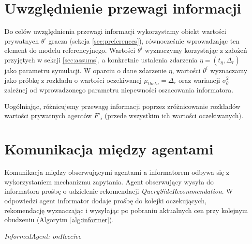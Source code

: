 \section{Uwzględnienie przewagi informacji}
Do celów uwzględnienia przewagi informacji wykorzystamy obiekt wartości prywatnych $\theta^i$ gracza (sekcja \ref{sec:preferences}), równocześnie wprowadzając ten element do modelu referencyjnego. Wartości $\theta^i$ wyznaczymy korzystając z założeń przyjętych w sekcji \ref{sec:assums}, a konkretnie ustalenia zdarzenia $\eta = (t_{\eta}, \Delta_r)$ jako parametru symulacji. W oparciu o dane zdarzenie $\eta$, wartości $\theta^i$ wyznaczamy jako próbkę z rozkładu o wartości oczekiwanej $\mu_{theta} = \Delta_r$ oraz wariancji $\sigma^2_{\theta}$ zależnej od wprowadzonego parametru niepewności oszacowania informatora. 

Uogólniając, różnicujemy przewagę informacji poprzez zróżnicowanie rozkładów wartości prywatnych agentów $F'_i$ (przede wszystkim ich wartości oczekiwanych).

\section{Komunikacja między agentami}

Komunikacja między obserwującymi agentami a informatorem odbywa się z wykorzystaniem mechanizmu zapytania. Agent obserwujący wysyła do informatora prośbę o udzielenie rekomendacji \textit{QuerySideRecommendation}. W odpowiedzi agent informator dodaje prośbę do kolejki oczekujących, rekomendację wyznaczając i wysyłając po pobraniu aktualnych cen przy kolejnym obudzeniu (Algorytm \ref{alg:informer}). 
\begin{pseudokod}
\caption{\textit{InformedAgent: onReceive}}\label{alg:informer}

\vspace{0.5cm}
\vspace{0.5cm}
\end{pseudokod}

